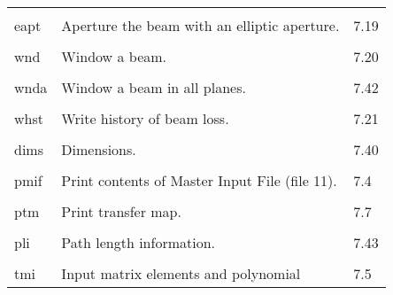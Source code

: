 \begin{center}
\begin{tabular}{lll}
\vspace{-3mm}& &\\
\hspace{1.5em}eapt  & Aperture the beam with an elliptic aperture. & \hspace{2em}7.19\\
\vspace{-3mm}& &\\
\hspace{1.5em}wnd  &         Window a beam.                & \hspace{2em}7.20\\
\vspace{-3mm}& &\\
\hspace{1.5em}wnda  &         Window a beam in all planes.       &
\hspace{2em}7.42\\
\vspace{-3mm}& &\\
\hspace{1.5em}whst  &         Write history of beam loss.          & \hspace{2em}7.21\\
\vspace{-3mm}& &\\
\hspace{1.5em}dims  &         Dimensions.         & \hspace{2em}7.40\\
\vspace{-3mm}& &\\
\hspace{1.5em}pmif  & Print contents of Master Input File (file 11). & \hspace{2em}7.4\\
\vspace{-3mm}& &\\
\hspace{1.5em}ptm   &        Print transfer map.                   & \hspace{2em}7.7\\
\vspace{-3mm}& &\\
\hspace{1.5em}pli   &        Path length information.                   &
\hspace{2em}7.43\\
\vspace{-3mm}& &\\
\hspace{1.5em}tmi   &        Input matrix elements and polynomial  & \hspace{2em}7.5\\

\end{tabular}
\end{center}

